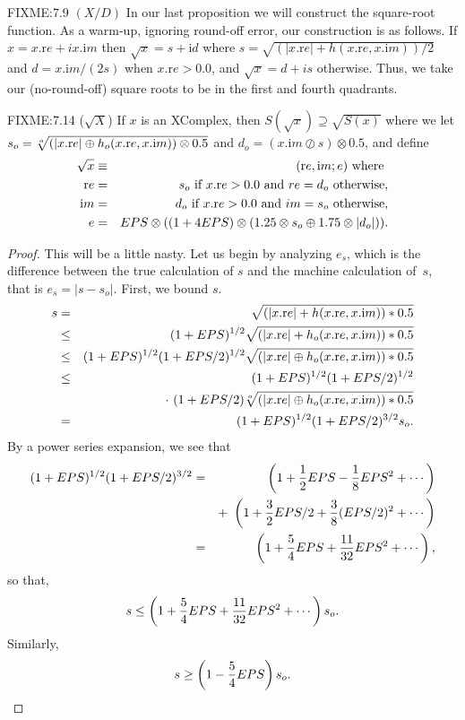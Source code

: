 \begin{definition}
\begin{proposition}{FIXME:7.9 $(X / D)$}
In our last proposition we will construct the square-root function.  As a warm-up, ignoring round-off error, our
construction is as follows.  If $x = x.{\mathrm re} + i x.{\mathrm im}$ then $\sqrt{x} = s + {\mathrm i d}$ where $s=\sqrt{(|x.{\mathrm
re}| + h(x.{\mathrm re},x.{\mathrm im}))/2}$ and $d = x.{\mathrm im}/(2s)$ when $x.{\mathrm re} > 0.0$, and $\sqrt{x} = d + i s$ otherwise.  
Thus, we take our (no-round-off) square roots to be in the first and fourth quadrants.

\begin{proposition}{FIXME:7.14 ($\sqrt{X}$)}
If $x$ is an {\textrm XComplex,} then $S(\sqrt{x}) \supseteq \sqrt{S(x)}$
where we
let $s_o = \root o \of {(|x.{\mathrm re}| \oplus h_o (x.{\mathrm re},x.{\mathrm im})) \otimes 0.5}$
 and $d_o = (x.{\mathrm im} \oslash s) \otimes 0.5${\textrm ,} and define
\begin{eqnarray*}
 \sqrt{x} & \equiv &({\mathrm re},{\mathrm im};e) \hbox{ where }\\
 {\mathrm re} &=& s_o \hbox{ if $x.{\mathrm re} > 0.0$ and $re = d_o$ otherwise},\\
{\mathrm im}& =& d_o \hbox{ if $x.{\mathrm re} > 0.0$ and $im = s_o$ otherwise},
\\
e& =& EPS \otimes ((1 + 4 EPS) \otimes (1.25 \otimes s_o \oplus 1.75 \otimes |d_o|)).
\end{eqnarray*}
\end{proposition}

\begin{proof}{}
This will be a little nasty.  Let us begin by analyzing $e_s$, which is the difference between the true calculation of $s$ and
the machine calculation of~$s$, that is $e_s = |s - s_o|.$   First, we bound $s.$
\begin{eqnarray*}
s &=& \sqrt{(|x.{\mathrm re}| + h(x.{\mathrm re},x.{\mathrm im})) * 0.5}\\
&\le& (1+EPS)^{1/2} \sqrt{(|x.{\mathrm re}| + h_o(x.{\mathrm re},x.{\mathrm im}))
* 0.5}\\
&\le& (1+EPS)^{1/2} (1+EPS/2)^{1/2}
\sqrt{(|x.{\mathrm re}| \oplus h_o(x.{\mathrm re},x.{\mathrm im})) * 0.5}\\
&\le& (1+EPS)^{1/2} (1+EPS/2)^{1/2}\\
&&\cdot\ (1+EPS/2)
\root o \of {(|x.{\mathrm re}| \oplus h_o(x.{\mathrm re},x.{\mathrm im})) * 0.5}\\
&=& (1+EPS)^{1/2} (1+EPS/2)^{3/2} s_o.
\end{eqnarray*}
By a power series expansion, we see that
\begin{eqnarray*}
(1+EPS)^{1/2} (1+EPS/2)^{3/2}&=&\left(1 + {1 \over 2} EPS - {1 \over 8} EPS^2 + \cdots\right)\\
&& +\
     \left(1 + {3 \over 2} EPS/2 + {3 \over 8} (EPS/2)^2 +\cdots\right)\\
&=&\left(1 + {5 \over 4} EPS + {11 \over 32} EPS^2 +\cdots\right),
\end{eqnarray*}
so that,
$$s \le \left(1 + {5 \over 4} EPS + {11 \over 32} EPS^2 + \cdots\right) s_o.$$
Similarly, 
$$s \ge \left(1 - {5 \over 4} EPS\right) s_o.$$


\end{proof}
\end{proposition}
\end{definition}
